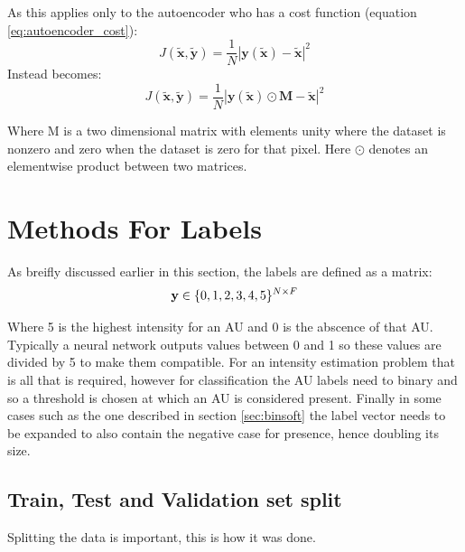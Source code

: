       As this applies only to the autoencoder who has a cost function (equation \ref{eq:autoencoder_cost}):
      \begin{equation}
          J(\tilde{\mathbf{x}},\tilde{\mathbf{y}})
          = \frac{1}{N}\left |\mathbf{y}(\tilde{\mathbf{x}})-\tilde{\mathbf{x}}\right | ^2
      \end{equation}
      Instead becomes:
      \begin{equation}
          J(\tilde{\mathbf{x}},\tilde{\mathbf{y}})
          = \frac{1}{N}\left |\mathbf{y}(\tilde{\mathbf{x}}) \odot \mathbf{M}-\tilde{\mathbf{x}}\right | ^2
      \end{equation}

      Where M is a two dimensional matrix with elements unity where the dataset is nonzero
      and zero when the dataset is zero for that pixel. Here $\odot$ denotes an elementwise
      product between two matrices.

  \section{Methods For Labels}

    As breifly discussed earlier in this section, the labels are defined as a matrix:
    \begin{equation}
      {\bf y} \in \{0,1,2,3,4,5\}^{N\times F}
    \end{equation}

    Where 5 is the highest intensity for an AU and 0 is the abscence of that AU.
    Typically a neural network outputs values between 0 and 1 so these values are divided by 5 to make them compatible.
    For an intensity estimation problem that is all that is required, however for classification
    the AU labels need to binary and so a threshold is chosen at which an AU is considered present.
    Finally in some cases such as the one described in section \ref{sec:binsoft} the label vector
    needs to be expanded to also contain the negative case for presence, hence doubling its size.

    \subsection{Train, Test and Validation set split}
      Splitting the data is important, this is how it was done.
